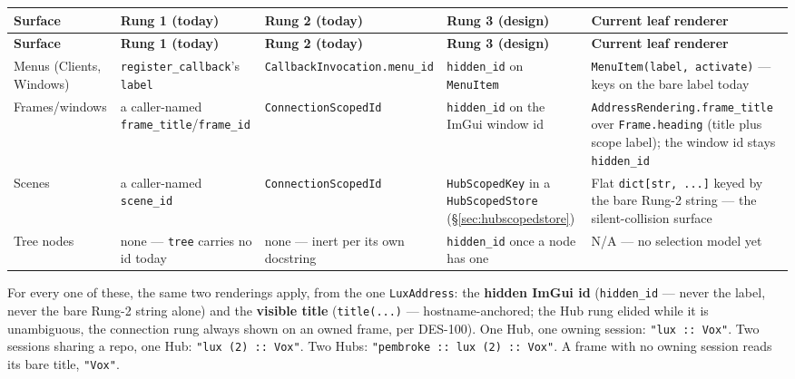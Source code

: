\documentclass[a4paper,10pt]{article}
\newcommand{\elem}[1]{\texttt{#1}}
\newcommand{\field}[1]{\texttt{#1}}
\begin{document}
\begin{longtable}{p{1.9cm}p{2.3cm}p{2.3cm}p{2.1cm}p{4.1cm}}
\toprule
\textbf{Surface} & \textbf{Rung 1 (today)} & \textbf{Rung 2 (today)} & \textbf{Rung 3 (design)} & \textbf{Current leaf renderer} \\
\midrule
\endfirsthead
\toprule
\textbf{Surface} & \textbf{Rung 1 (today)} & \textbf{Rung 2 (today)} & \textbf{Rung 3 (design)} & \textbf{Current leaf renderer} \\
\midrule
\endhead
Menus (Clients, Windows) & \field{register\_callback}'s \field{label} &
  \texttt{CallbackInvocation.menu\_id} & \field{hidden\_id} on
  \texttt{MenuItem} & \texttt{MenuItem(label, activate)} --- keys on the
  bare label today \\
Frames/windows & a caller-named \field{frame\_title}/\field{frame\_id} &
  \texttt{ConnectionScopedId} & \field{hidden\_id} on the ImGui window id &
  \texttt{AddressRendering.frame\_title} over \field{Frame.heading}
  (title plus scope label); the window id stays \field{hidden\_id} \\
Scenes & a caller-named \field{scene\_id} & \texttt{ConnectionScopedId} &
  \texttt{HubScopedKey} in a \texttt{HubScopedStore} (\S\ref{sec:hubscopedstore})
  & Flat \texttt{dict[str, ...]}
  keyed by the bare Rung-2 string --- the silent-collision surface \\
Tree nodes & none --- \elem{tree} carries no id today & none --- inert per
  its own docstring & \field{hidden\_id} once a node has one & N/A --- no
  selection model yet \\
\bottomrule
\end{longtable}

For every one of these, the same two renderings apply, from the one
\texttt{LuxAddress}: the \textbf{hidden ImGui id} (\field{hidden\_id} ---
never the label, never the bare Rung-2 string alone) and the \textbf{visible
title} (\texttt{title(...)} --- hostname-anchored; the Hub rung elided
while it is unambiguous, the connection rung always shown on an owned
frame, per DES-100).  One Hub, one owning session: \texttt{"lux :: Vox"}.
Two sessions sharing a repo, one Hub: \texttt{"lux (2) :: Vox"}.  Two
Hubs: \texttt{"pembroke :: lux (2) :: Vox"}.  A frame with no owning
session reads its bare title, \texttt{"Vox"}.
\end{document}
